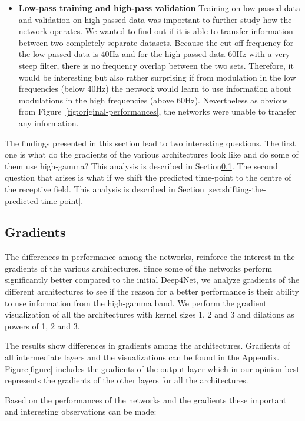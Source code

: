 \begin{itemize}
    \item \textbf{Low-pass training and high-pass validation}
Training on low-passed data and validation on high-passed data was important to further study how the network operates.
We wanted to find out if it is able to transfer information between two completely separate datasets.
Because the cut-off frequency for the low-passed data is 40Hz and for the high-passed data 60Hz with a very steep filter, there is no frequency overlap between the two sets.
Therefore, it would be interesting but also rather surprising if from modulation in the low frequencies (below 40Hz) the network would learn to use information about modulations in the high frequencies (above 60Hz).
Nevertheless as obvious from Figure~\ref{fig:original-performances}, the networks were unable to transfer any information.
\end{itemize}
The findings presented in this section lead to two interesting questions.
The first one  is what do the gradients of the various architectures look like and do some of them use high-gamma?
This analysis is described in Section\ref{subsec:gradients}.
The second question that arises is what if  we shift the predicted time-point to the centre of the receptive field.
This analysis is described in Section \ref{sec:shifting-the-predicted-time-point}.

\subsection{Gradients}\label{subsec:gradients}
The differences in performance among the networks, reinforce the interest in the gradients of the various architectures.
Since some of the networks perform significantly better compared to the initial Deep4Net, we analyze gradients of the different architectures to see if the reason for a better performance is their ability to use information from the high-gamma band.
We perform the gradient visualization of all the architectures with kernel sizes 1, 2 and 3 and dilations as powers of 1, 2 and 3.

The results show differences in gradients among the architectures.
Gradients of all intermediate layers and the visualizations can be found in the Appendix.
Figure\ref{figure} includes the gradients of the output layer which in our opinion best represents the gradients of the other layers for all the architectures.

Based on the performances of the networks and the gradients these important and interesting observations can be made:

